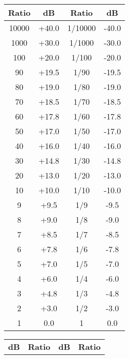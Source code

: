 \begin{figure}[h]
    \centering
    \begin{minipage}{0.48\textwidth}
        \centering
        \scriptsize
        \begin{tabular}{|c|c||c|c|}
            \hline
            \textbf{Ratio} & \textbf{dB} & \textbf{Ratio} & \textbf{dB} \\
            \hline
            10000 & +40.0 & 1/10000 & -40.0 \\
            1000 & +30.0 & 1/1000 & -30.0 \\
            100 & +20.0 & 1/100 & -20.0 \\
            90 & +19.5 & 1/90 & -19.5 \\
            80 & +19.0 & 1/80 & -19.0 \\
            70 & +18.5 & 1/70 & -18.5 \\
            60 & +17.8 & 1/60 & -17.8 \\
            50 & +17.0 & 1/50 & -17.0 \\
            40 & +16.0 & 1/40 & -16.0 \\
            30 & +14.8 & 1/30 & -14.8 \\
            20 & +13.0 & 1/20 & -13.0 \\
            10 & +10.0 & 1/10 & -10.0 \\
            9 & +9.5 & 1/9 & -9.5 \\
            8 & +9.0 & 1/8 & -9.0 \\
            7 & +8.5 & 1/7 & -8.5 \\
            6 & +7.8 & 1/6 & -7.8 \\
            5 & +7.0 & 1/5 & -7.0 \\
            4 & +6.0 & 1/4 & -6.0 \\
            3 & +4.8 & 1/3 & -4.8 \\
            2 & +3.0 & 1/2 & -3.0 \\
            1 & 0.0 & 1 & 0.0 \\
            \hline
        \end{tabular}
        \label{tab:power-db-ratios}
    \end{minipage}%
    \begin{minipage}{0.48\textwidth}
        \centering
        \scriptsize
        \begin{tabular}{|c|c||c|c|}
            \hline
            \textbf{dB} & \textbf{Ratio} & \textbf{dB} & \textbf{Ratio} \\

\end{tabular}
\end{minipage}
\end{figure}
